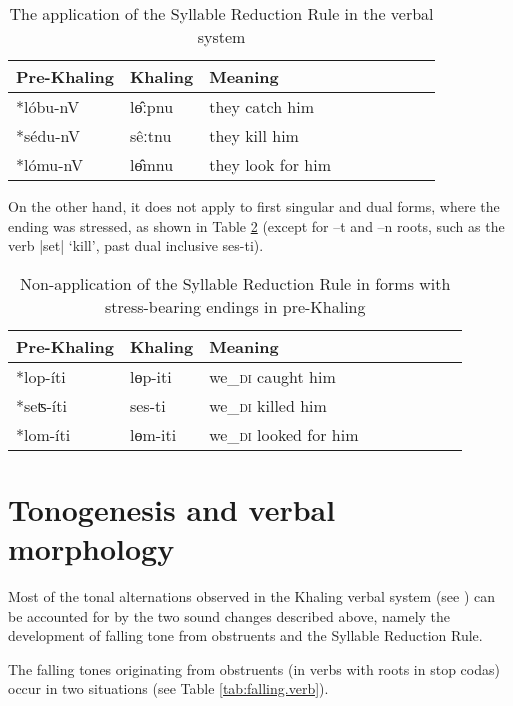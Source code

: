 \documentclass[oldfontcommands,oneside,a4paper,11pt]{article}
\newcommand{\ipa}[1]{{\phon \mbox{#1}}} %
\begin{document}
\begin{table}[H] 
\caption{The application of the  Syllable Reduction Rule in the verbal system} \centering  \label{tab:verbal.drr} 
\begin{tabular}{lllllllll} 
\toprule 
Pre-Khaling	&Khaling &Meaning\\
\midrule
\ipa{*lóbu-nV}  & \ipa{lɵ̂ːpnu} & they catch him \\ 
\ipa{*sédu-nV} & \ipa{sêːtnu} & they kill him \\ 
\ipa{*lómu-nV}  & \ipa{lɵ̂mnu} & they look for him \\
\bottomrule
\end{tabular}
\end{table}

On the other hand, it does not apply to first singular and dual forms, where the ending was stressed, as shown in Table \ref{tab:verbal.du} (except for \ipa{--t} and \ipa{--n} roots, such as the verb |set| `kill', past dual inclusive \ipa{ses-ti}).



\begin{table}[H] 
\caption{Non-application of the  Syllable Reduction Rule in forms with stress-bearing endings in pre-Khaling} \centering  \label{tab:verbal.du} 
\begin{tabular}{lllllllll} 
\toprule 
Pre-Khaling	&Khaling &Meaning\\
\midrule
\ipa{*lop-íti}  & \ipa{lɵp-iti} & we_{\textsc{di}} caught him \\ 
\ipa{*seʦ-íti} & \ipa{ses-ti} & we_{\textsc{di}} killed him \\ 
\ipa{*lom-íti}  & \ipa{lɵm-iti} & we_{\textsc{di}} looked for him \\
\bottomrule
\end{tabular}
\end{table}



\section{Tonogenesis and verbal morphology} \label{sec:tonogenesis.verb}
Most of the tonal alternations observed in the Khaling verbal system (see \citealt{jacques12khaling}) can be accounted for by the two sound changes described above, namely the development of falling tone from obstruents and the Syllable Reduction Rule.

 The falling tones originating from obstruents (in verbs with roots in stop codas) occur in two situations (see Table \ref{tab:falling.verb}).
 
\end{document}
